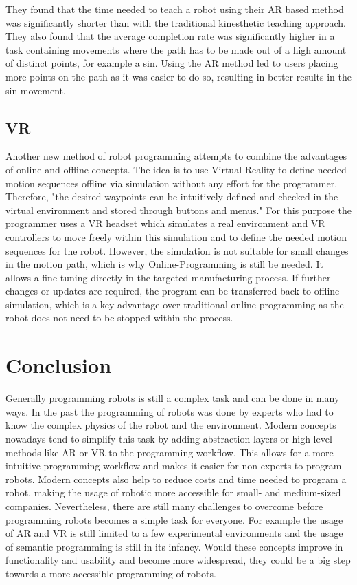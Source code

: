 \documentclass[conference]{IEEEtran}
\begin{document}
        They found that the time needed to teach a robot using their AR based method was significantly shorter than with the traditional kinesthetic teaching approach. 
        They also found that the average completion rate was significantly higher in a task containing movements where the path has to be made out of a high amount of distinct points, for example a sin. Using the AR method led to users placing more points on the path as it was easier to do so, resulting in better results in the sin movement.
        \cite[pp. 4-5]{p3}

    \subsection{VR}
        Another new method of robot programming attempts to combine the advantages of online and offline concepts. The idea is to use Virtual Reality to define needed motion sequences offline via simulation without any effort for the programmer. Therefore, "the desired waypoints can be intuitively defined and checked in the virtual environment and stored through buttons and menus."  \cite[p. 625]{p2} For this purpose the programmer uses a VR headset which simulates a real environment and VR controllers to move freely within this simulation and to define the needed motion sequences for the robot. \cite[p. 627]{p2}
        However, the simulation is not suitable for small changes in the motion path, which is why Online-Programming is still be needed. It allows a fine-tuning directly in the targeted manufacturing process. If further changes or updates are required, the program can be transferred back to offline simulation, which is a key advantage over traditional online programming as the robot does not need to be stopped within the process. \cite[p. 625]{p2}

\section{Conclusion}

    Generally programming robots is still a complex task and can be done in many ways. 
    In the past the programming of robots was done by experts who had to know the complex physics of the robot and the environment. Modern concepts nowadays tend to simplify this task by adding abstraction layers or high level methods like AR or VR to the programming workflow. This allows for a more intuitive programming workflow and makes it easier for non experts to program robots. Modern concepts also help to reduce costs and time needed to program a robot, making the usage of robotic more accessible for small- and medium-sized companies.
    Nevertheless, there are still many challenges to overcome before programming robots becomes a simple task for everyone. For example the usage of AR and VR is still limited to a few experimental environments and the usage of semantic programming is still in its infancy. Would these concepts improve in functionality and usability and become more widespread, they could be a big step towards a more accessible programming of robots.
\end{document}

